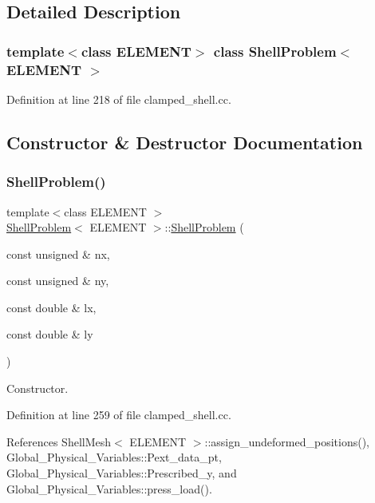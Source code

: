 \subsection{Detailed Description}
\subsubsection*{template$<$class E\+L\+E\+M\+E\+NT$>$\newline
class Shell\+Problem$<$ E\+L\+E\+M\+E\+N\+T $>$}



Definition at line 218 of file clamped\+\_\+shell.\+cc.



\subsection{Constructor \& Destructor Documentation}
\mbox{\label{classShellProblem_a1ec644498c95acea00cc05c5bd30d075}} 
\subsubsection{\texorpdfstring{Shell\+Problem()}{ShellProblem()}\hspace{0.1cm}{\footnotesize\ttfamily [1/2]}}
{\footnotesize\ttfamily template$<$class E\+L\+E\+M\+E\+NT $>$ \\
\hyperlink{classShellProblem}{Shell\+Problem}$<$ E\+L\+E\+M\+E\+NT $>$\+::\hyperlink{classShellProblem}{Shell\+Problem} (\begin{DoxyParamCaption}\item[{const unsigned \&}]{nx,  }\item[{const unsigned \&}]{ny,  }\item[{const double \&}]{lx,  }\item[{const double \&}]{ly }\end{DoxyParamCaption})}



Constructor. 



Definition at line 259 of file clamped\+\_\+shell.\+cc.



References Shell\+Mesh$<$ E\+L\+E\+M\+E\+N\+T $>$\+::assign\+\_\+undeformed\+\_\+positions(), Global\+\_\+\+Physical\+\_\+\+Variables\+::\+Pext\+\_\+data\+\_\+pt, Global\+\_\+\+Physical\+\_\+\+Variables\+::\+Prescribed\+\_\+y, and Global\+\_\+\+Physical\+\_\+\+Variables\+::press\+\_\+load().



